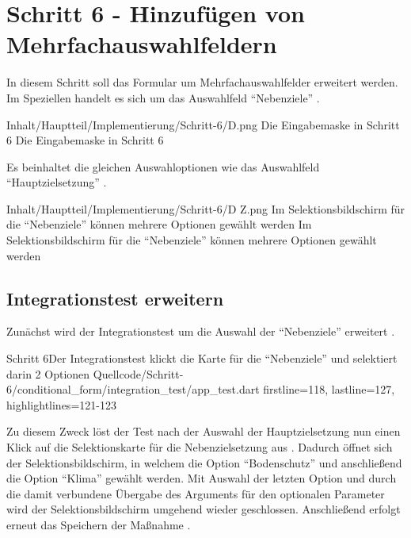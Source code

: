 \chapter{Schritt 6 - Hinzufügen von Mehrfachauswahlfeldern}
\label{chap:Schritt-6}

In diesem Schritt soll das Formular um Mehrfachauswahlfelder erweitert werden.
Im Speziellen handelt es sich um das Auswahlfeld \enquote{Nebenziele} \Abb{\ref{fig:Schritt4EingabemaskeD}}.
\begin{alexfigure}{Inhalt/Hauptteil/Implementierung/Schritt-6/D.png}
  {Die Eingabemaske in Schritt 6}
  {Die Eingabemaske in Schritt 6}

  \label{fig:Schritt4EingabemaskeD}

\end{alexfigure}


Es beinhaltet die gleichen Auswahloptionen wie das Auswahlfeld \enquote{Hauptzielsetzung} \Abb{\ref{fig:Schritt4EingabemaskeDZ}}.
\begin{alexfigure}{Inhalt/Hauptteil/Implementierung/Schritt-6/D Z.png}
  {Im Selektionsbildschirm für die \enquote{Nebenziele} können mehrere Optionen gewählt werden}
  {Im Selektionsbildschirm für die \enquote{Nebenziele} können mehrere Optionen gewählt werden}

  \label{fig:Schritt4EingabemaskeDZ}

\end{alexfigure}

\clearpage
\section{Integrationstest erweitern}

Zunächst wird der Integrationstest um die Auswahl der \enquote{Nebenziele} erweitert \Lst{\ref{lst:Schritt6tabSelectionCard}}.

\begin{alexlisting}{Schritt 6}{Der Integrationstest klickt die Karte für die \enquote{Nebenziele} und selektiert darin 2 Optionen}
  {Quellcode/Schritt-6/conditional_form/integration_test/app_test.dart}
  {firstline=118, lastline=127, highlightlines={121-123}}
  \label{lst:Schritt6tabSelectionCard}
\end{alexlisting}

Zu diesem Zweck löst der Test nach der Auswahl der Hauptzielsetzung  nun einen Klick auf die Selektionskarte für die Nebenzielsetzung aus .
Dadurch öffnet sich der Selektionsbildschirm,
in welchem die Option \enquote{Bodenschutz}  und anschließend die Option \enquote{Klima}  gewählt werden.
Mit Auswahl der letzten Option
und durch die damit verbundene Übergabe des Arguments  für den optionalen Parameter  wird der Selektionsbildschirm umgehend wieder geschlossen.
Anschließend erfolgt erneut das Speichern der Maßnahme .



